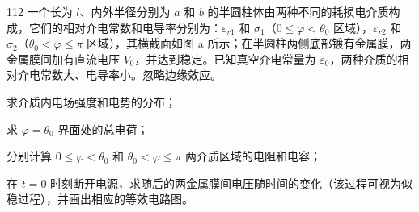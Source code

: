\begin{problem}[第36届全国中学生物理竞赛决赛][介质半圆柱体中的电场与电路]{112}
    一个长为 $l$、内外半径分别为 $a$ 和 $b$ 的半圆柱体由两种不同的耗损电介质构成，它们的相对介电常数和电导率分别为：$\varepsilon_{r1}$ 和 $\sigma_{1}$（$0\leq\varphi<\theta_{0}$ 区域），$\varepsilon_{r2}$ 和 $\sigma_{2}$（$\theta_{0}<\varphi\leq\pi$ 区域），其横截面如图 a 所示；在半圆柱两侧底部镀有金属膜，两金属膜间加有直流电压 $V_{0}$，并达到稳定。已知真空介电常量为 $\varepsilon_{0}$，两种介质的相对介电常数大、电导率小。忽略边缘效应。
    \begin{subproblem}
        求介质内电场强度和电势的分布；
    \end{subproblem}
    \begin{subproblem}
        求 $\varphi = \theta_0$ 界面处的总电荷；
    \end{subproblem}
    \begin{subproblem}
        分别计算 $0 \leq \varphi < \theta_{0}$ 和 $\theta_{0} < \varphi \leq \pi$ 两介质区域的电阻和电容；
    \end{subproblem}
    \begin{subproblem}
        在 $t = 0$ 时刻断开电源，求随后的两金属膜间电压随时间的变化（该过程可视为似稳过程），并画出相应的等效电路图。
    \end{subproblem}
\end{problem}